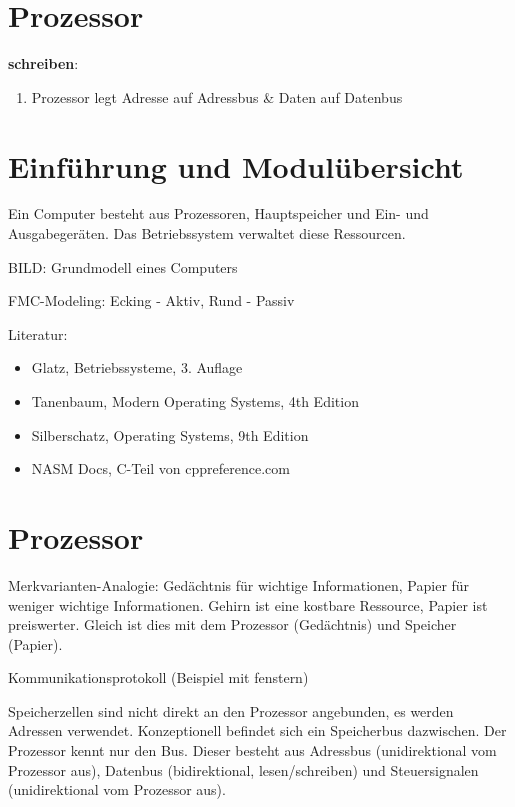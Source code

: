 

\newcommand{\TITLE}{Betriebssysteme 1}
\newcommand{\AUTHOR}{Mona Panchaud}
\newcommand{\INSTITUTE}{Ostschweizer Fachhochschule}

\begin{multicols*}{4}

\section{Prozessor}
\textbf{schreiben}:
\begin{enumerate}
    \item Prozessor legt Adresse auf Adressbus \& Daten auf Datenbus
\end{enumerate}

\section{Einführung und Modulübersicht}
Ein Computer besteht aus Prozessoren, Hauptspeicher und Ein- und Ausgabegeräten. Das Betriebssystem verwaltet diese Ressourcen.

BILD: Grundmodell eines Computers

FMC-Modeling: Ecking - Aktiv, Rund - Passiv

Literatur:
\begin{itemize}
    \item Glatz, Betriebssysteme, 3. Auflage
    \item Tanenbaum, Modern Operating Systems, 4th Edition
    \item Silberschatz, Operating Systems, 9th Edition
    \item NASM Docs, C-Teil von cppreference.com
\end{itemize}

\section{Prozessor}
Merkvarianten-Analogie: Gedächtnis für wichtige Informationen, Papier für weniger wichtige Informationen. Gehirn ist eine kostbare Ressource, Papier ist preiswerter. Gleich ist dies mit dem Prozessor (Gedächtnis) und Speicher (Papier).

Kommunikationsprotokoll (Beispiel mit fenstern)

Speicherzellen sind nicht direkt an den Prozessor angebunden, es werden Adressen verwendet. Konzeptionell befindet sich ein Speicherbus dazwischen. Der Prozessor kennt nur den Bus. Dieser besteht aus Adressbus (unidirektional vom Prozessor aus), Datenbus (bidirektional, lesen/schreiben) und Steuersignalen (unidirektional vom Prozessor aus).


\end{multicols*}
